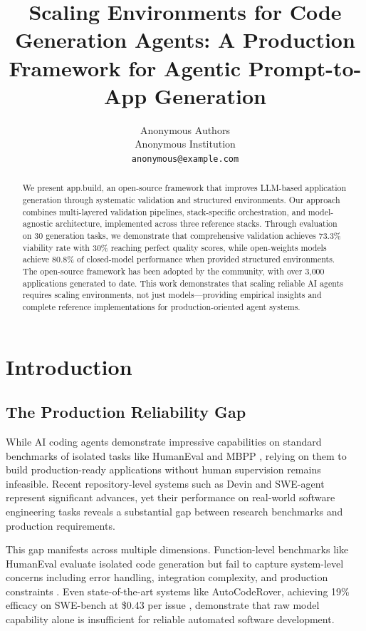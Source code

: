 \documentclass[11pt]{article}
\title{Scaling Environments for Code Generation Agents: A Production Framework for Agentic Prompt-to-App Generation}
\author{Anonymous Authors \\
  Anonymous Institution \\
  \texttt{anonymous@example.com}}
\begin{document}
\maketitle

\begin{abstract}
We present app.build, an open-source framework that improves LLM-based application generation through systematic validation and structured environments. Our approach combines multi-layered validation pipelines, stack-specific orchestration, and model-agnostic architecture, implemented across three reference stacks. Through evaluation on 30 generation tasks, we demonstrate that comprehensive validation achieves 73.3\% viability rate with 30\% reaching perfect quality scores, while open-weights models achieve 80.8\% of closed-model performance when provided structured environments. The open-source framework has been adopted by the community, with over 3,000 applications generated to date. This work demonstrates that scaling reliable AI agents requires scaling environments, not just models---providing empirical insights and complete reference implementations for production-oriented agent systems.
\end{abstract}

\section{Introduction}
\label{sec:intro}

\subsection{The Production Reliability Gap}

While AI coding agents demonstrate impressive capabilities on standard benchmarks of isolated tasks like HumanEval \citep{chen2021evaluating} and MBPP \citep{austin2021program}, relying on them to build production-ready applications without human supervision remains infeasible. Recent repository-level systems such as Devin \citep{cognition2024swe} and SWE-agent \citep{yang2024swe} represent significant advances, yet their performance on real-world software engineering tasks reveals a substantial gap between research benchmarks and production requirements.

This gap manifests across multiple dimensions. Function-level benchmarks like HumanEval evaluate isolated code generation but fail to capture system-level concerns including error handling, integration complexity, and production constraints \citep{liu2023your}. Even state-of-the-art systems like AutoCodeRover, achieving 19\% efficacy on SWE-bench at \$0.43 per issue \citep{zhang2024autocoder}, demonstrate that raw model capability alone is insufficient for reliable automated software development.
\end{document}
